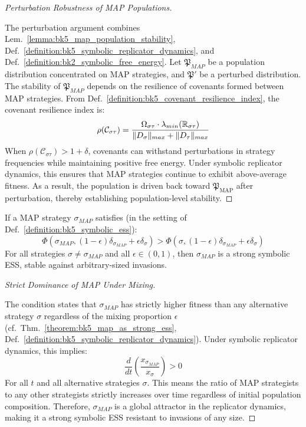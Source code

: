 \begin{proof}[Perturbation Robustness of MAP Populations]
\label{proof:bk5_map_perturbation_robustness}
\leavevmode

The perturbation argument combines Lem.~\ref{lemma:bk5_map_population_stability}, Def.~\ref{definition:bk5_symbolic_replicator_dynamics}, and Def.~\ref{definition:bk2_symbolic_free_energy}.
Let $\mathfrak{P}_{MAP}$ be a population distribution concentrated on MAP strategies, and $\mathfrak{P}'$ be a perturbed distribution.
The stability of $\mathfrak{P}_{MAP}$ depends on the resilience of covenants formed between MAP strategies. From Def.~\ref{definition:bk5_covenant_resilience_index}, the covenant resilience index is:
\begin{equation}
\rho(\mathcal{C}_{\sigma\tau}) = \frac{\Omega_{\sigma\tau} \cdot \lambda_{min}(\mathbb{R}_{\sigma\tau})}{\|D_\sigma\|_{max} + \|D_\tau\|_{max}}
\end{equation}
When $\rho(\mathcal{C}_{\sigma\tau}) > 1 + \delta$, covenants can withstand perturbations in strategy frequencies while maintaining positive free energy.
Under symbolic replicator dynamics, this ensures that MAP strategies 
continue to exhibit above-average fitness. 
As a result, the population is driven back toward \( \mathfrak{P}_{\text{MAP}} \) after perturbation, 
thereby establishing population-level stability.
\end{proof}
\begin{theorem}
\label{theorem:bk5_map_as_strong_ess}
If a MAP strategy $\sigma_{MAP}$ satisfies (in the setting of Def.~\ref{definition:bk5_symbolic_ess}):
\begin{equation}
\Phi(\sigma_{MAP}, (1-\epsilon)\delta_{\sigma_{MAP}} + \epsilon\delta_{\sigma}) > \Phi(\sigma, (1-\epsilon)\delta_{\sigma_{MAP}} + \epsilon\delta_{\sigma})
\end{equation}
For all strategies $\sigma \neq \sigma_{MAP}$ and all $\epsilon \in (0,1)$, then $\sigma_{MAP}$ is a strong symbolic ESS, stable against arbitrary-sized invasions.
\end{theorem}
\begin{proof}[Strict Dominance of MAP Under Mixing]
\label{proof:bk5_map_strict_fitness_dominance}
\leavevmode

The condition states that $\sigma_{MAP}$ has strictly higher fitness than any alternative strategy $\sigma$ regardless of the mixing proportion $\epsilon$ (cf.~Thm.~\ref{theorem:bk5_map_as_strong_ess}, Def.~\ref{definition:bk5_symbolic_replicator_dynamics}).
Under symbolic replicator dynamics, this implies:
\begin{equation}
\frac{d}{dt}\left(\frac{x_{\sigma_{MAP}}}{x_\sigma}\right) > 0
\end{equation}
For all $t$ and all alternative strategies $\sigma$. This means the ratio of MAP strategists to any other strategists strictly increases over time regardless of initial population composition.
Therefore, $\sigma_{MAP}$ is a global attractor in the replicator dynamics, making it a strong symbolic ESS resistant to invasions of any size.
\end{proof}
